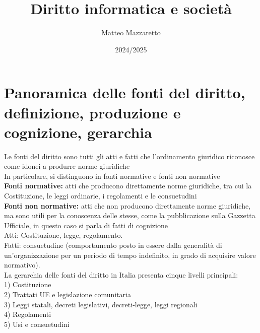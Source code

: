 \documentclass[10pt,oneside,a4paper]{article}
\title{Diritto informatica e società}
\author{Matteo Mazzaretto}
\date{2024/2025}
\begin{document}
	\maketitle
	\begin{center}
		\renewcommand{\contentsname}{Indice}
		\tableofcontents
	\end{center}
	\newpage
	\setcounter{page}{1}
	\section{Panoramica delle fonti del diritto, definizione, produzione e cognizione, gerarchia}
	Le fonti del diritto sono tutti gli atti e fatti che l'ordinamento giuridico riconosce come idonei a produrre norme giuridiche\\
	In particolare, si distinguono in fonti normative e fonti non normative\\
	\textbf{Fonti normative:} atti che producono direttamente norme giuridiche, tra cui la Costituzione, le leggi ordinarie, i regolamenti e le consuetudini\\
	\textbf{Fonti non normative:} atti che non producono direttamente norme giuridiche, ma sono utili per la conoscenza delle stesse, come la pubblicazione sulla Gazzetta Ufficiale, in questo caso si parla di fatti di cognizione\\
	Atti: Costituzione, legge, regolamento.\\
	Fatti: consuetudine (comportamento posto in essere dalla generalità di un'organizzazione per un periodo di tempo indefinito, in grado di acquisire valore normativo).\\
	La gerarchia delle fonti del diritto in Italia presenta cinque livelli principali:\\
	1) Costituzione\\
	2) Trattati UE e legislazione comunitaria\\
	3) Leggi statali, decreti legislativi, decreti-legge, leggi regionali\\
	4) Regolamenti\\
	5) Usi e consuetudini
\end{document}
